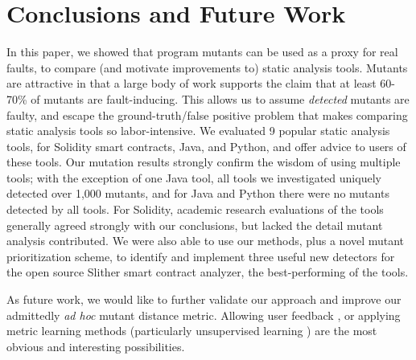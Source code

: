 \section{Conclusions and Future Work}

In this paper, we showed that program mutants can be used as a proxy
for real faults, to compare (and motivate improvements to) static
analysis tools.  Mutants are attractive in that a large body of work supports the
claim that at least 60-70\% of mutants are fault-inducing.   This
allows us to assume \emph{detected} mutants are faulty, and escape the
ground-truth/false positive problem that makes comparing static
analysis tools so labor-intensive.   We
evaluated 9 popular static analysis tools, for Solidity smart contracts, Java,
and Python, and offer advice to users of these tools.  Our mutation
results strongly confirm the wisdom of using multiple tools; with the
exception of one Java tool, all tools we investigated uniquely
detected over 1,000 mutants, and for Java and Python there were no
mutants detected by all tools. For Solidity,
academic research evaluations of the tools generally agreed strongly
with our conclusions, but lacked the detail mutant analysis contributed.
We were also able to use our methods, plus a novel mutant prioritization scheme, to
identify and implement three useful new detectors for the open source Slither smart contract
analyzer, the best-performing of the tools.

As future work, we would like to further validate our approach and
improve our admittedly \emph{ad hoc} mutant distance metric.  Allowing
user feedback \cite{EndUserMistake,OnlyOracle}, or applying metric
learning methods \cite{kulis2012metric} (particularly unsupervised
learning \cite{scholkopf1998nonlinear,tipping1999probabilistic}) are
the most obvious and interesting possibilities.

